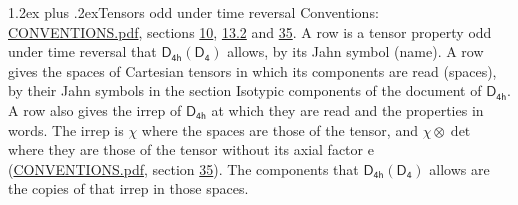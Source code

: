 \documentclass[10pt,a4paper]{article}
\makeatletter
\renewcommand\section{\@startsection{section}{1}{\z@}{-3ex plus -1ex minus -.2ex}%
  {1.2ex plus .2ex}{\normalfont\large\sffamily\bfseries\color{parttitle}}}
\numberwithin{equation}{section}
\newcommand{\grp}[1]{\mathsf{#1}}
\newcommand{\irrprod}{\otimes}
\makeatother
\begin{document}
\section{Tensors odd under time reversal}\label{s:time_odd}
Conventions: \href{../../CONVENTIONS.pdf}{CONVENTIONS.pdf}, sections \href{../../../rotation/CONVENTIONS.pdf\#conv.10}{10}, \href{../../../rotation/CONVENTIONS.pdf\#conv.13.2}{13.2} and \href{../../CONVENTIONS.pdf\#conv.35}{35}.
\leavevmode\label{n:head.name.property}A row is a tensor property odd under time reversal that $\grp{D_{4h}}(\grp{D_{4}})$ allows, by its Jahn symbol (name). \label{n:head.spaces}A row gives the spaces of Cartesian tensors in which its components are read (spaces), by their Jahn symbols in the section Isotypic components of the document of \href{../../../rotation/data/pdf/D4h.pdf}{$\grp{D_{4h}}$}. \label{n:head.properties}A row also gives the irrep of $\grp{D_{4h}}$ at which they are read and the properties in words. The irrep is $\chi$ where the spaces are those of the tensor, and $\chi \irrprod \det$ where they are those of the tensor without its axial factor e (\href{../../CONVENTIONS.pdf}{CONVENTIONS.pdf}, section \href{../../CONVENTIONS.pdf\#conv.35}{35}). The components that $\grp{D_{4h}}(\grp{D_{4}})$ allows are the copies of that irrep in those spaces.
\end{document}
